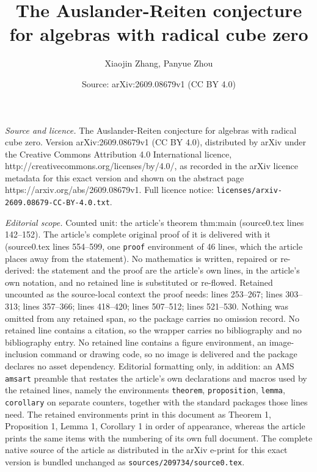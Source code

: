 \documentclass[10pt,a4paper]{amsart}
\title{The Auslander-Reiten conjecture for algebras with radical cube zero}
\author{Xiaojin Zhang, Panyue Zhou}
\date{Source: arXiv:2609.08679v1 (CC BY 4.0)}
\begin{document}
\maketitle

\noindent\emph{Source and licence.} The Auslander-Reiten conjecture for algebras with radical cube zero. Version arXiv:2609.08679v1 (CC BY 4.0), distributed by arXiv under the Creative Commons Attribution 4.0 International licence, http://creativecommons.org/licenses/by/4.0/, as recorded in the arXiv licence metadata for this exact version and shown on the abstract page https://arxiv.org/abs/2609.08679v1. Full licence notice: \texttt{licenses/arxiv-2609.08679-CC-BY-4.0.txt}.\par\smallskip

\noindent\textit{Editorial scope.} Counted unit: the article's theorem thm:main (source0.tex lines 142--152). The article's complete original proof of it is delivered with it (source0.tex lines 554--599, one \texttt{proof} environment of 46 lines, which the article places away from the statement). No mathematics is written, repaired or re-derived: the statement and the proof are the article's own lines, in the article's own notation, and no retained line is substituted or re-flowed.  Retained uncounted as the source-local context the proof needs: lines 253--267; lines 303--313; lines 357--366; lines 418--420; lines 507--512; lines 521--530.  Nothing was omitted from any retained span, so the package carries no omission record.  No retained line contains a citation, so the wrapper carries no bibliography and no bibliography entry.  No retained line contains a figure environment, an image-inclusion command or drawing code, so no image is delivered and the package declares no asset dependency.  Editorial formatting only, in addition: an AMS \texttt{amsart} preamble that restates the article's own declarations and macros used by the retained lines, namely the environments \texttt{theorem}, \texttt{proposition}, \texttt{lemma}, \texttt{corollary} on separate counters, together with the standard packages those lines need.  The retained environments print in this document as Theorem 1, Proposition 1, Lemma 1, Corollary 1 in order of appearance, whereas the article prints the same items with the numbering of its own full document.  The complete native source of the article as distributed in the arXiv e-print for this exact version is bundled unchanged as \texttt{sources/209734/source0.tex}.
\end{document}
